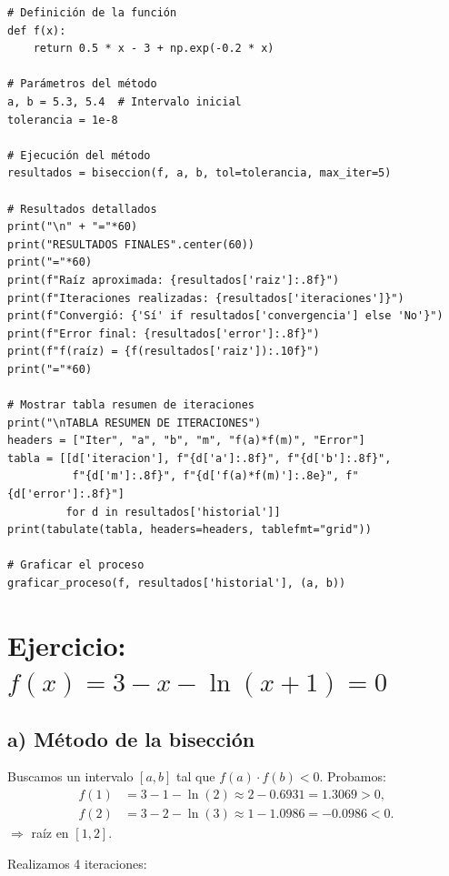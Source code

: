 \documentclass[12pt]{article}
\begin{document}
\begin{center}
\begin{tcolorbox}[title=Codigo python,
                  colback=white,
                  colframe=black,
                  breakable, enhanced]
\begin{lstlisting}[style=mypython]
# Definición de la función
def f(x):
    return 0.5 * x - 3 + np.exp(-0.2 * x)

# Parámetros del método
a, b = 5.3, 5.4  # Intervalo inicial
tolerancia = 1e-8

# Ejecución del método
resultados = biseccion(f, a, b, tol=tolerancia, max_iter=5)

# Resultados detallados
print("\n" + "="*60)
print("RESULTADOS FINALES".center(60))
print("="*60)
print(f"Raíz aproximada: {resultados['raiz']:.8f}")
print(f"Iteraciones realizadas: {resultados['iteraciones']}")
print(f"Convergió: {'Sí' if resultados['convergencia'] else 'No'}")
print(f"Error final: {resultados['error']:.8f}")
print(f"f(raíz) = {f(resultados['raiz']):.10f}")
print("="*60)

# Mostrar tabla resumen de iteraciones
print("\nTABLA RESUMEN DE ITERACIONES")
headers = ["Iter", "a", "b", "m", "f(a)*f(m)", "Error"]
tabla = [[d['iteracion'], f"{d['a']:.8f}", f"{d['b']:.8f}", 
          f"{d['m']:.8f}", f"{d['f(a)*f(m)']:.8e}", f"{d['error']:.8f}"] 
         for d in resultados['historial']]
print(tabulate(tabla, headers=headers, tablefmt="grid"))

# Graficar el proceso
graficar_proceso(f, resultados['historial'], (a, b))
\end{lstlisting}
\end{tcolorbox}



\section*{Ejercicio: \(f(x) = 3 - x - \ln(x+1) = 0\)}

\subsection*{a) Método de la bisección}

Buscamos un intervalo \([a,b]\) tal que \(f(a)\cdot f(b)<0\). Probamos:
\[
\begin{aligned}
f(1) &= 3 - 1 - \ln(2) \approx 2 - 0.6931 = 1.3069 > 0,\\
f(2) &= 3 - 2 - \ln(3) \approx 1 - 1.0986 = -0.0986 < 0.
\end{aligned}
\]
\(\Rightarrow\) raíz en \([1,2]\).

Realizamos 4 iteraciones:


\end{center}
\end{document}
